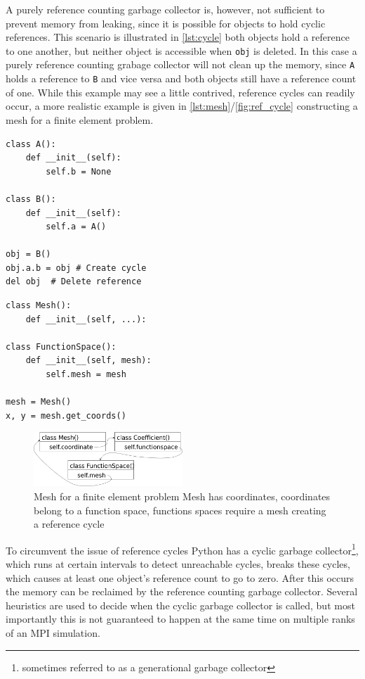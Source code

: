 \documentclass[10pt,journal,compsoc]{IEEEtran}
\begin{document}
A purely reference counting garbage collector is, however, not sufficient to prevent memory from leaking, since it is possible for objects to hold cyclic references.
This scenario is illustrated in \cref{lst:cycle} both objects hold a reference to one another, but neither object is accessible when \verb`obj` is deleted.
In this case a purely reference counting grabage collector will not clean up the memory, since \verb`A` holds a reference to \verb`B` and vice versa and both objects still have a reference count of one.
While this example may see a little contrived, reference cycles can readily occur, a more realistic example is given in \cref{lst:mesh}/\cref{fig:ref_cycle} constructing a mesh for a finite element problem.

\lstset{language=python}
\begin{lstlisting}[float={t}, caption={Example of simple reference cycle}, label={lst:cycle}]
class A():
	def __init__(self):
		self.b = None

class B():
	def __init__(self):
		self.a = A()
		
obj = B()
obj.a.b = obj # Create cycle
del obj  # Delete reference
\end{lstlisting}

\begin{lstlisting}[float={t}, caption={Example of simple reference cycle}, label={lst:mesh}]
class Mesh():
	def __init__(self, ...):

class FunctionSpace():
	def __init__(self, mesh):
		self.mesh = mesh
		
mesh = Mesh()
x, y = mesh.get_coords()
\end{lstlisting}

\begin{figure}
	\includegraphics[width=0.5\textwidth]{gc_real/4.png}
	\caption{Mesh for a finite element problem Mesh has coordinates, coordinates belong to a function space, functions spaces require a mesh creating a reference cycle}
	\label{fig:mesh_ref_cycle}
\end{figure}

To circumvent the issue of reference cycles Python has a cyclic garbage collector\footnote{sometimes referred to as a generational garbage collector}, which runs at certain intervals to detect unreachable cycles, breaks these cycles, which causes at least one object's reference count to go to zero.
After this occurs the memory can be reclaimed by the reference counting garbage collector.
Several heuristics are used to decide when the cyclic garbage collector is called, but most importantly this is not guaranteed to happen at the same time on multiple ranks of an MPI simulation.
\end{document}
